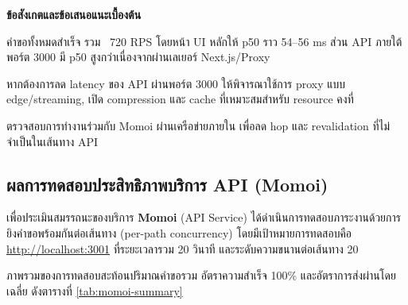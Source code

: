 \begin{table}[htbp]
    \centering
    \caption{}
    \label{tab:midori-paths}
\end{table}

\newpage
\hspace*{1.5em}
\textbf{ข้อสังเกตและข้อเสนอแนะเบื้องต้น}
\begin{mycustomitem}
    \item คำขอทั้งหมดสำเร็จ รวม ~720 RPS โดยหน้า UI หลักให้ p50 ราว 54–56 ms ส่วน API ภายใต้พอร์ต 3000 มี p50 สูงกว่าเนื่องจากผ่านเลเยอร์ Next.js/Proxy
    \item หากต้องการลด latency ของ API ผ่านพอร์ต 3000 ให้พิจารณาใช้การ proxy แบบ edge/streaming, เปิด compression และ cache ที่เหมาะสมสำหรับ resource คงที่
    \item ตรวจสอบการทำงานร่วมกับ Momoi ผ่านเครือข่ายภายใน เพื่อลด hop และ revalidation ที่ไม่จำเป็นในเส้นทาง API
\end{mycustomitem}

\subsection{ผลการทดสอบประสิทธิภาพบริการ API (Momoi)}
\label{sec:momoi-perf}
\hspace*{1.5em}
เพื่อประเมินสมรรถนะของบริการ \textbf{Momoi} (API Service) ได้ดำเนินการทดสอบภาระงานด้วยการยิงคำขอพร้อมกันต่อเส้นทาง (per-path concurrency) โดยมีเป้าหมายการทดสอบคือ \url{http://localhost:3001} ที่ระยะเวลารวม 20 วินาที และระดับความขนานต่อเส้นทาง 20

\hspace*{1.5em}
ภาพรวมของการทดสอบสะท้อนปริมาณคำขอรวม อัตราความสำเร็จ 100\% และอัตราการส่งผ่านโดยเฉลี่ย ดังตารางที่ \ref{tab:momoi-summary}

